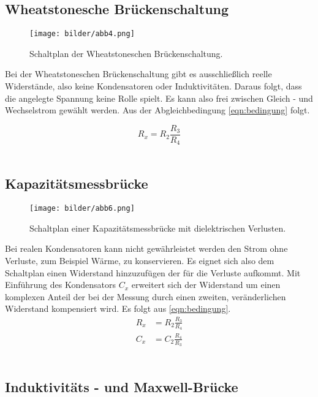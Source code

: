 \subsection{Wheatstonesche Brückenschaltung}
\begin{figure}
    \centering
    \texttt{[image: bilder/abb4.png]}
    \caption{Schaltplan der Wheatstoneschen Brückenschaltung. \cite{skript}} 
    \label{fig:abb4}
\end{figure}
\begin{flushleft}
Bei der Wheatstoneschen Brückenschaltung gibt es ausschließlich reelle Widerstände, also  keine Kondensatoren
oder Induktivitäten. Daraus folgt, dass die angelegte Spannung keine Rolle spielt. Es kann also frei zwischen
Gleich - und Wechselstrom gewählt werden. Aus der Abgleichbedingung \eqref{eqn:bedingung} folgt.
\end{flushleft}
\begin{equation}
    \label{eqn:what}
    R_x = R_2 \frac{R_3}{R_4}
\end{equation}
\\
\newline
\subsection{Kapazitätsmessbrücke}
\begin{figure}
    \centering
    \texttt{[image: bilder/abb6.png]}
    \caption{Schaltplan einer Kapazitätsmessbrücke mit dielektrischen Verlusten. \cite{skript}} 
    \label{fig:abb6}
\end{figure}
Bei realen Kondensatoren kann nicht gewährleistet werden den Strom ohne Verluste, zum Beispiel Wärme, 
zu konservieren. Es eignet sich also dem Schaltplan einen Widerstand hinzuzufügen der für die Verluste aufkommt.
Mit Einführung des Kondensators $C_x$ erweitert sich der Widerstand um einen komplexen Anteil der bei der Messung durch 
einen zweiten, veränderlichen Widerstand kompensiert wird. 
Es folgt aus \eqref{eqn:bedingung}.
\begin{align}
    \label{eqn:wombocombo}
    R_x &= R_2\frac{R_3}{R_4} \\
    C_x &= C_2\frac{R_4}{R_3}
\end{align}
\\
\newline
\subsection{Induktivitäts - und Maxwell-Brücke }

